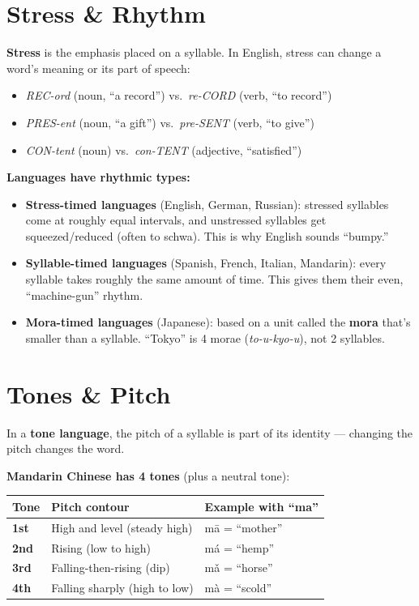 \documentclass[11pt, letterpaper]{article}
\begin{document}
\section*{Stress \& Rhythm}

\textbf{Stress} is the emphasis placed on a syllable. In English, stress can change a word's meaning or its part of speech:
\begin{itemize}[noitemsep]
  \item \emph{REC-ord} (noun, ``a record'') vs.\ \emph{re-CORD} (verb, ``to record'')
  \item \emph{PRES-ent} (noun, ``a gift'') vs.\ \emph{pre-SENT} (verb, ``to give'')
  \item \emph{CON-tent} (noun) vs.\ \emph{con-TENT} (adjective, ``satisfied'')
\end{itemize}

\textbf{Languages have rhythmic types:}
\begin{itemize}[noitemsep]
  \item \textbf{Stress-timed languages} (English, German, Russian): stressed syllables come at roughly equal intervals, and unstressed syllables get squeezed/reduced (often to schwa). This is why English sounds ``bumpy.''
  \item \textbf{Syllable-timed languages} (Spanish, French, Italian, Mandarin): every syllable takes roughly the same amount of time. This gives them their even, ``machine-gun'' rhythm.
  \item \textbf{Mora-timed languages} (Japanese): based on a unit called the \textbf{mora} that's smaller than a syllable. ``Tokyo'' is 4 morae (\emph{to-u-kyo-u}), not 2 syllables.
\end{itemize}

\section*{Tones \& Pitch}

In a \textbf{tone language}, the pitch of a syllable is part of its identity --- changing the
pitch changes the word.

\textbf{Mandarin Chinese has 4 tones} (plus a neutral tone):

\noindent
{\renewcommand{\arraystretch}{1.5}
\begin{tabularx}{\textwidth}{>{\bfseries\centering\arraybackslash}p{1.5cm}
                              >{\raggedright\arraybackslash}p{4cm}
                              >{\raggedright\arraybackslash}X}
\toprule
\rowcolor{tableheaderteal}
\textbf{Tone} & \textbf{Pitch contour} & \textbf{Example with ``ma''} \\
\midrule
\rowcolor{rowTe} 1st & High and level (steady high)         & m\=a = ``mother'' \\
\rowcolor{rowA}  2nd & Rising (low to high)                 & m\'a = ``hemp'' \\
\rowcolor{rowTe} 3rd & Falling-then-rising (dip)            & m\v{a} = ``horse'' \\
\rowcolor{rowA}  4th & Falling sharply (high to low)        & m\`a = ``scold'' \\
\bottomrule
\end{tabularx}}
\end{document}
